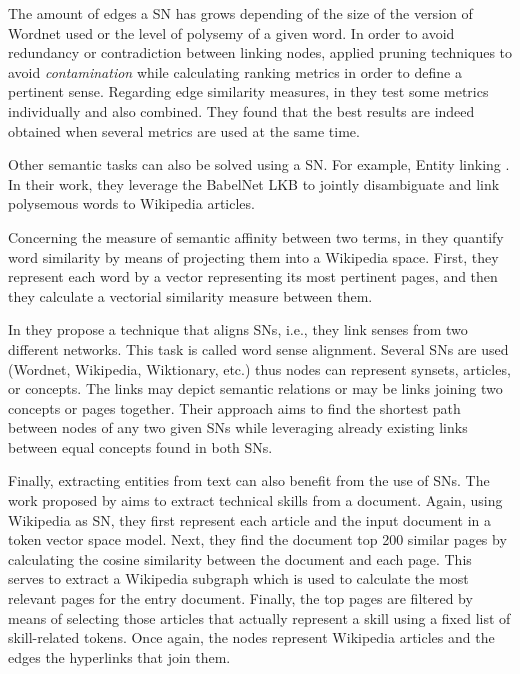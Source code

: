 The amount of edges a SN has grows depending of the size of the version of Wordnet used or the level of polysemy of a given word. In order to avoid redundancy or contradiction between  linking nodes, \cite{2004.Mihalcea.SemanticNetworkPageRank,2007.Navigli.GraphConnectivity} applied pruning techniques to avoid \textit{contamination} while calculating ranking metrics in order to define a pertinent sense. Regarding edge similarity measures,  in  \cite{2007.Sinha.Mihalcea.Unsupervised, 2007.Tsatsaronis.WSDwithSpreading} they test some metrics individually and also combined. They found that the best results are indeed obtained when several metrics are used at the same time.

Other semantic tasks can also be solved using a SN. For example, Entity linking \cite{2014.Moro.Navigli.EntityLinking_WSD}. In their work, they leverage the BabelNet LKB to jointly disambiguate and link polysemous words to Wikipedia articles. 

Concerning the measure of semantic affinity between two terms, in \cite{2009.Yeh.Wikiwalk} they quantify word similarity by means of projecting them into a Wikipedia space. First, they represent each word by a vector representing its most pertinent pages,  and then they calculate a vectorial similarity measure between them.

In \cite{2013.Matuschek.Gurevych.Dijsktra.WSA} they propose a technique that aligns SNs, i.e., they link senses from two different networks. This task is called word sense alignment. Several SNs are used (Wordnet, Wikipedia, Wiktionary, etc.) thus nodes can represent synsets, articles, or concepts. The links may depict semantic relations or may be links joining two concepts or pages together. Their approach aims to find the shortest path between nodes of any two given SNs while leveraging already existing links between  equal concepts found in both SNs.



Finally, extracting entities from text can also benefit from the use of SNs. The work proposed by  \cite{2013.Kivimaki.AGraph-BasedApproach} aims to extract technical skills from a document. Again, using Wikipedia as SN, they first represent each article and the input document in a token vector space model.  Next, they find the document top 200 similar pages by calculating the cosine similarity between the document and each page. This serves to extract a Wikipedia subgraph which is used to calculate the most relevant pages for the entry document. Finally, the top pages are filtered by means of selecting those articles that actually represent a skill using a fixed list of skill-related tokens. Once again, the nodes represent Wikipedia articles and the edges the hyperlinks that join them.


